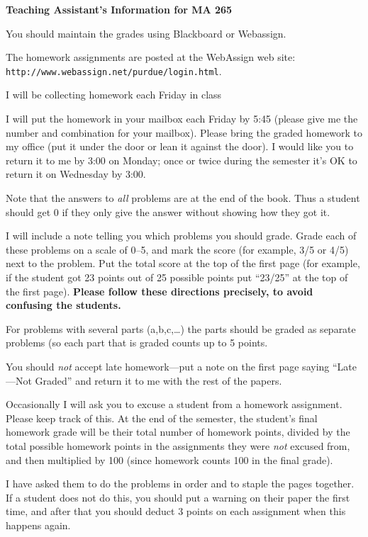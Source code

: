 \documentclass[12pt]{article}
\begin{document}
\begin{center}
{\large\bf Teaching Assistant's Information for MA 265}
\end{center}

You should maintain the grades using Blackboard or Webassign.  

The homework assignments are posted at the WebAssign web site:\\
{\tt http://www.webassign.net/purdue/login.html}.

I will be collecting homework each Friday in class

I will put the homework in your mailbox each Friday by 5:45 (please give me the
number and combination for your mailbox).
Please bring the graded homework to my office (put it under the door or lean
it against the door).
I would like you to return it to me by 3:00 on Monday; once or twice during the
semester it's OK to return it on Wednesday by 3:00.

Note that the answers to {\it all} problems are at the end of the book.  Thus a
student should get 0 if they only give the answer without showing how they got
it.

I will include a note telling you which problems you should grade.  Grade 
each of these problems on a scale of 0--5, and mark the score (for example, 3/5
or 4/5) next to the problem.  
Put the total score at the top of the first page (for example, if the student 
got 23 points out of 25 possible points put ``23/25'' at the top of the first 
page).  {\bf Please follow these directions precisely, to avoid confusing the 
students.}

For problems with several parts (a,b,c,\dots) the parts should be graded as
separate problems (so each part that is graded counts up to 5 points.

You should {\it not} accept late homework---put a note on the first page saying
``Late---Not Graded'' and return it to me with the rest of the papers.

Occasionally I will ask you to excuse a student from a homework assignment.
Please keep track of this. At 
the end
of the semester, the student's final homework grade will be their total 
number of homework points, divided by the total possible homework points in the
assignments they were {\it not} excused from, and then multiplied by 100 (since
homework counts 100 in the final grade).

I have asked them to do the problems in order and to staple the pages together.
If a student does not do this, you should put a warning on their paper the
first time, and after that you should deduct 3 points on each 
assignment when this happens again.
\end{document}
